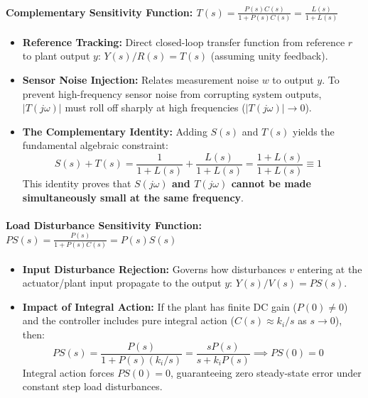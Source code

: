 \documentclass[12pt,onecolumn,twoside ]{article}
\begin{document}
	\paragraph{Complementary Sensitivity Function: $T(s) = \frac{P(s)C(s)}{1 + P(s)C(s)} = \frac{L(s)}{1 + L(s)}$}
	\begin{itemize}
		\item
		\textbf{Reference Tracking:} Direct closed-loop transfer function from reference $r$ to plant output $y$: $Y(s)/R(s) = T(s)$ (assuming unity feedback).
		\item
		\textbf{Sensor Noise Injection:} Relates measurement noise $w$ to output $y$. To prevent high-frequency sensor noise from corrupting system outputs, $|T(j\omega)|$ must roll off sharply at high frequencies ($|T(j\omega)| \to 0$).
		\item
		\textbf{The Complementary Identity:} Adding $S(s)$ and $T(s)$ yields the fundamental algebraic constraint: \[
		S(s) + T(s) = \frac{1}{1 + L(s)} + \frac{L(s)}{1 + L(s)} = \frac{1 + L(s)}{1 + L(s)} \equiv 1 \quad
		\] This identity proves that \textbf{$S(j\omega)$ and $T(j\omega)$ cannot be made simultaneously small at the same frequency}.
	\end{itemize}
	\paragraph{Load Disturbance Sensitivity Function: $PS(s) = \frac{P(s)}{1 + P(s)C(s)} = P(s)S(s)$}
	\begin{itemize}
		\item
		\textbf{Input Disturbance Rejection:} Governs how disturbances $v$ entering at the actuator/plant input propagate to the output $y$: $Y(s)/V(s) = PS(s)$.
		\item
		\textbf{Impact of Integral Action:} If the plant has finite DC gain ($P(0) \neq 0$) and the controller includes pure integral action ($C(s) \approx k_i/s$ as $s \to 0$), then: \[
		PS(s) = \frac{P(s)}{1 + P(s)(k_i/s)} = \frac{s P(s)}{s + k_i P(s)} \implies PS(0) = 0 \quad
		\] Integral action forces $PS(0) = 0$, guaranteeing zero steady-state error under constant step load disturbances.
	\end{itemize}
\end{document}
